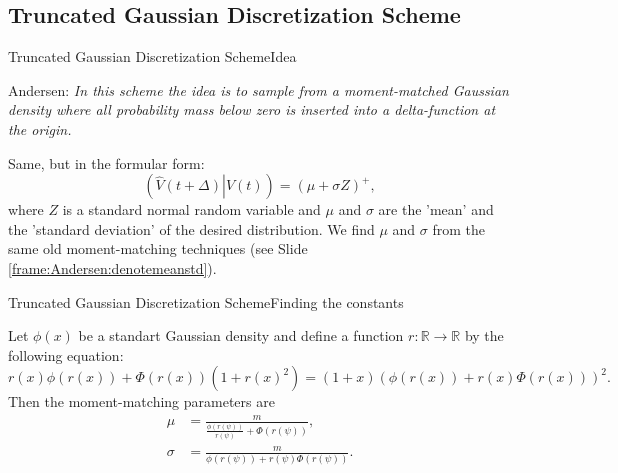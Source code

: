 \subsection{Truncated Gaussian Discretization Scheme}
    \begin{frame}{Truncated Gaussian Discretization Scheme}{Idea}
        \begin{block}{Andersen:}
            \emph{In this scheme the idea is to sample from a moment-matched Gaussian density where all probability
            mass below zero is inserted into a delta-function at the origin.}
        \end{block} 
        Same, but in the formular form:
        \begin{equation}
            \left(\left.\hat{V}(t+\Delta)\right| V(t)\right) = \left(\mu + \sigma Z\right)^+,
        \end{equation}
        where $Z$ is a standard normal random variable and $\mu$ and $\sigma$ are the 'mean' and the 'standard deviation' of the desired distribution.
        We find $\mu$ and $\sigma$ from the same old moment-matching techniques (see Slide \ref{frame:Andersen:denotemeanstd}).
    \end{frame}

    \begin{frame}{Truncated Gaussian Discretization Scheme}{Finding the constants}
        \begin{proposition}
            Let $\phi(x)$ be a standart Gaussian density and define a function $r:\mathbb{R} \to \mathbb{R}$ by the following equation:
            \begin{equation}
                r(x)\phi(r(x))+\Phi(r(x))(1+r(x)^2)= (1+x)\left(\phi(r(x)) + r(x)\Phi(r(x))\right)^2.
            \end{equation}
            Then the moment-matching parameters are
            \begin{align}
                \mu &= \frac{m}{\frac{\phi(r(\psi))}{r(\psi)} + \Phi(r(\psi))},\\ 
                \sigma &= \frac{m}{\phi(r(\psi)) + r(\psi)\Phi(r(\psi))}.
            \end{align}
        \end{proposition}
    \end{frame}

